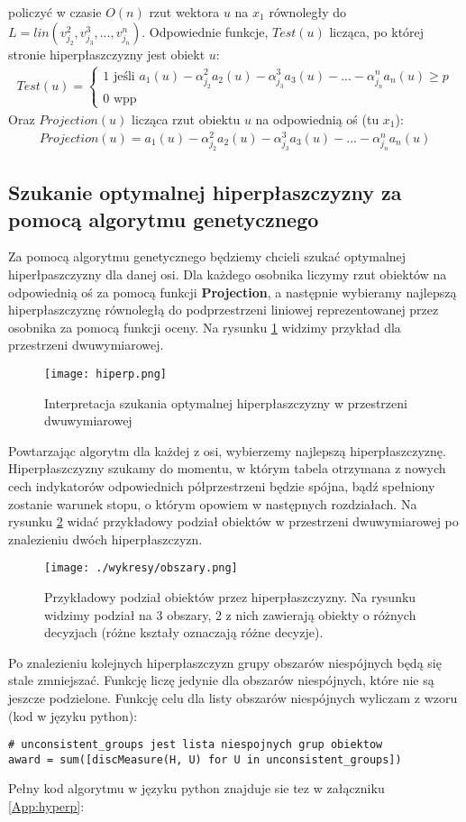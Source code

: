 \documentclass[magisterska]{pracamgr}
\theoremstyle{plain}
\theoremstyle{definition}
\theoremstyle{remark}
\begin{document}
policzyć w czasie $O(n)$ rzut wektora $u$ na $x_1$ równoległy do $L = lin(v_{j_2}^2, v_{j_3}^3, ..., v_{j_n}^n)$. Odpowiednie funkcje, $Test(u)$
licząca, po której stronie hiperpłaszczyzny jest obiekt $u$:
\begin{align*}
 Test(u) = \begin{cases} 1 \text{ jeśli } a_1(u) - \alpha_{j_2}^2 a_2(u) - \alpha_{j_3}^3 a_3(u) - 
 ... - \alpha_{j_n}^n a_n(u) \geq p \\ 0 \text{ wpp } \end{cases}
\end{align*}
Oraz $Projection(u)$ licząca rzut obiektu $u$ na odpowiednią oś (tu $x_1$):
\begin{align*}
 Projection(u) = a_1(u) - \alpha_{j_2}^2 a_2(u) - \alpha_{j_3}^3 a_3(u) - ... - \alpha_{j_n}^n a_n(u)
\end{align*}
\subsection{Szukanie optymalnej hiperpłaszczyzny za pomocą algorytmu genetycznego}
Za pomocą algorytmu genetycznego będziemy chcieli szukać optymalnej hiperłpaszczyzny dla danej osi. Dla każdego osobnika liczymy rzut obiektów na 
odpowiednią oś za pomocą funkcji \textbf{Projection}, a następnie wybieramy najlepszą hiperpłaszczyznę równoległą do podprzestrzeni liniowej 
reprezentowanej przez osobnika za pomocą funkcji oceny. Na rysunku \ref{fig:hiperp} widzimy przykład dla przestrzeni dwuwymiarowej.
\begin{figure}
 \caption{Interpretacja szukania optymalnej hiperpłaszczyzny w przestrzeni dwuwymiarowej}\label{fig:hiperp}
 \texttt{[image: hiperp.png]}
\end{figure}
Powtarzając algorytm dla każdej z osi,
wybierzemy najlepszą hiperpłaszczyznę. Hiperpłaszczyzny szukamy do momentu, w którym tabela otrzymana z nowych cech indykatorów odpowiednich 
półprzestrzeni będzie spójna, bądź spełniony zostanie warunek stopu, o którym opowiem w następnych rozdziałach. Na rysunku \ref{fig:obszary}
widać przykładowy podział obiektów w przestrzeni dwuwymiarowej po znalezieniu dwóch hiperpłaszczyzn.
\begin{figure}
 \caption{Przykładowy podział obiektów przez hiperpłaszczyzny. Na rysunku widzimy podział na 3 obszary, 2 z nich zawierają obiekty
 o różnych decyzjach (różne kształy oznaczają różne decyzje).}\label{fig:obszary}
 \texttt{[image: ./wykresy/obszary.png]}
\end{figure}
Po znalezieniu kolejnych hiperpłaszczyzn grupy obszarów niespójnych będą się stale zmniejszać. Funkcję liczę jedynie dla obszarów
niespójnych, które nie są jeszcze podzielone. Funkcję celu dla listy obszarów niespójnych wyliczam z wzoru (kod w języku python):
\begin{lstlisting}
# unconsistent_groups jest lista niespojnych grup obiektow
award = sum([discMeasure(H, U) for U in unconsistent_groups])
\end{lstlisting}
Pełny kod algorytmu w języku python znajduje sie tez w załączniku \ref{App:hyperp}:
    
\end{document}
